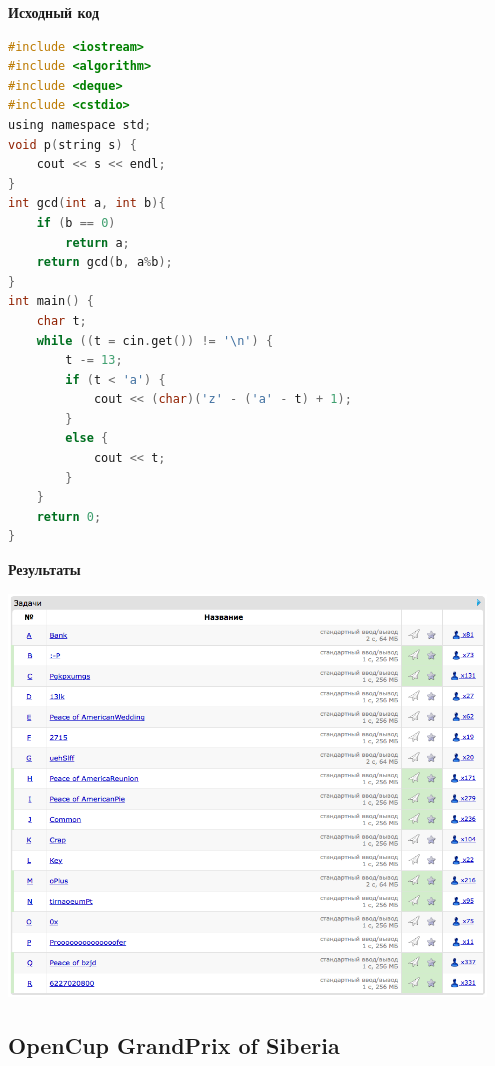 \documentclass[a4paper,12pt]{article}
\begin{document}
\textbf{{\large Исходный код}}
\begin{lstlisting}[language=C]
#include <iostream>
#include <algorithm>
#include <deque>
#include <cstdio>
using namespace std;
void p(string s) {
	cout << s << endl;
}
int gcd(int a, int b){
    if (b == 0)
        return a;
    return gcd(b, a%b);
}
int main() {
	char t;
	while ((t = cin.get()) != '\n') {
		t -= 13;
		if (t < 'a') {
			cout << (char)('z' - ('a' - t) + 1);
		}
		else {
			cout << t;
		}
	}
	return 0;
}
\end{lstlisting}

\newpage
\textbf{{\large Результаты}} \\
\begin{center}
\includegraphics[width=0.95\textwidth]{CT_Crypto/CT_Crypto_result.png}\\ [1cm]
\end{center}



%
%
\newpage
\subsection{OpenCup GrandPrix of Siberia}
\end{document}
